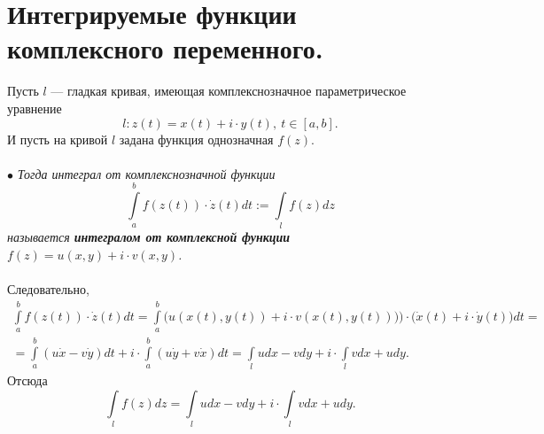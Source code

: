 \documentclass[a4paper, 12pt]{article}
\newcommand{\intab}{\int\limits_a^b}
\begin{document}
\section{Интегрируемые функции комплексного переменного.}
Пусть $l$ --- гладкая кривая, имеющая комплекснозначное параметрическое уравнение $$l: z(t) = x(t) + i\cdot y(t),\ t\in[a,b].$$
И пусть на кривой $l$ задана функция однозначная $f(z)$.\\\\
$\bullet$ \textit{Тогда интеграл от комплекснозначной функции $$\intab f(z(t))\cdot \dot z (t) dt := \int\limits_l f(z)dz$$ называется \textbf{интегралом от комплексной функции} $f(z) = u(x,y) + i \cdot v(x,y)$.}\\\\
Следовательно, \begin{multline*}
	\intab f(z(t))\cdot \dot z (t) dt = \intab\Big(u(x(t),y(t)) + i\cdot v(x(t),y(t)))\Big)\cdot \Big(\dot x(t) + i\cdot \dot y(t)\Big)dt =\\= \intab (u\dot x - v\dot y)dt + i\cdot \intab (u\dot y + v\dot x)dt= \int\limits_l udx - vdy + i\cdot \int\limits_l vdx + udy.
\end{multline*}
Отсюда $$\int\limits_l f(z)dz = \int\limits_l udx - vdy + i\cdot \int\limits_l vdx + udy.$$
\end{document}
